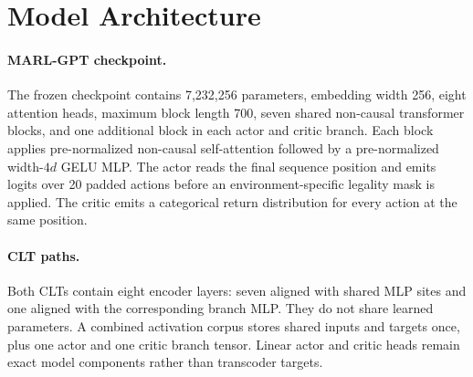 \section{Model Architecture}

\paragraph{MARL-GPT checkpoint.}
The frozen checkpoint contains 7,232,256 parameters, embedding width 256, eight attention heads, maximum block length 700, seven shared non-causal transformer blocks, and one additional block in each actor and critic branch. Each block applies pre-normalized non-causal self-attention followed by a pre-normalized width-$4d$ GELU MLP. The actor reads the final sequence position and emits logits over 20 padded actions before an environment-specific legality mask is applied. The critic emits a categorical return distribution for every action at the same position.

\paragraph{CLT paths.}
Both CLTs contain eight encoder layers: seven aligned with shared MLP sites and one aligned with the corresponding branch MLP. They do not share learned parameters. A combined activation corpus stores shared inputs and targets once, plus one actor and one critic branch tensor. Linear actor and critic heads remain exact model components rather than transcoder targets.
